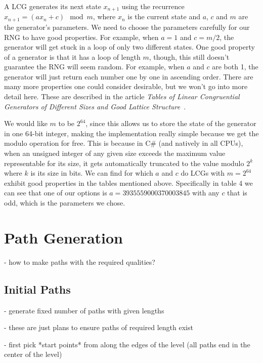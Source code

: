 A LCG generates its next state $x_{n+1}$ using the recurrence $x_{n+1} = (ax_n + c) \mod{m}$, where $x_n$ is the current state and $a$, $c$ and $m$ are the generator's parameters.
We need to choose the parameters carefully for our RNG to have good properties.
For example, when $a = 1$ and $c = m/2$, the generator will get stuck in a loop of only two different states.
One good property of a generator is that it has a loop of length $m$, though, this still doesn't guarantee the RNG will seem random.
For example, when $a$ and $c$ are both 1, the generator will just return each number one by one in ascending order.
There are many more properties one could consider desirable, but we won't go into more detail here.
These are described in the article \emph{Tables of Linear Congruential Generators of Different Sizes and Good Lattice Structure}~\cite{LCGTables}.

We would like $m$ to be $2^{64}$, since this allows us to store the state of the generator in one 64-bit integer, making the implementation really simple because we get the modulo operation for free.
This is because in C\# (and natively in all CPUs), when an unsigned integer of any given size exceeds the maximum value representable for its size, it gets automatically truncated to the value modulo $2^k$ where $k$ is its size in bits.
We can find for which $a$ and $c$ do LCGs with $m = 2^{64}$ exhibit good properties in the tables mentioned above.
Specifically in table 4 we can see that one of our options is $a = 3935559000370003845$ with any $c$ that is odd, which is the parameters we chose.

\section{Path Generation}

- how to make paths with the required qualities?

\subsection{Initial Paths}

- generate fixed number of paths with given lengths

- these are just plans to ensure paths of required length exist

- first pick *start points* from along the edges of the level (all paths end in the center of the level)

